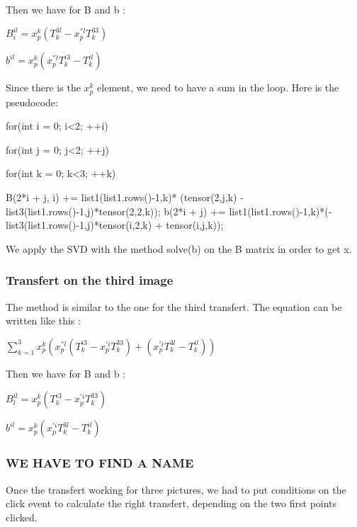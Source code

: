 \documentclass{report}
\begin{document}
Then we have for B and b :  
\begin{center}
$B_{i}^{il} = x_{p}^{k}(T_{k}^{3l} - x_{p}^{''l}T_{k}^{33})$
\end{center}
\begin{center}
$b^{il} = x_{p}^{k}(x_{p}^{''l}T_{k}^{i3} - T_{k}^{il})$
\end{center}

Since there is the $x_{p}^{k}$ element, we need to have a sum in the loop. Here is the pseudocode:

for(int i = 0; i<2; ++i) {
              for(int j = 0; j<2; ++j) {
                for(int k = 0; k<3; ++k) {
                  B(2*i + j, i) +=  list1(list1.rows()-1,k)*  (tensor(2,j,k) - list3(list1.rows()-1,j)*tensor(2,2,k));
                  b(2*i + j) += list1(list1.rows()-1,k)*(-list3(list1.rows()-1,j)*tensor(i,2,k) + tensor(i,j,k));

                }
              }
            }  

We apply the SVD with the method solve(b) on the B matrix in order to get x. 

\subsubsection{Transfert on the third image}
The method is similar to the one for the third transfert.
The equation can be written like this : 

\begin{center}
 $ \displaystyle { \sum_{k = 1}^{3}} x_{p}^{k}(x_{p}^{''l}(T_{k}^{i3} - x_{p}^{'i}T_{k}^{33}) + ( x_{p}^{'i}T_{k}^{3l} - T_{k}^{il}))$ 
\end{center}

Then we have for B and b :  
\begin{center}
$B_{l}^{il} = x_{p}^{k}(T_{k}^{i3} - x_{p}^{'i}T_{k}^{33})$
\end{center}
\begin{center}
$b^{il} = x_{p}^{k}(x_{p}^{'i}T_{k}^{3l} - T_{k}^{il})$
\end{center}

\subsubsection{WE HAVE TO FIND A NAME}
Once the transfert working for three pictures, we had to put conditions on the click event to calculate the right transfert, depending on the two first points clicked.  
\end{document}
